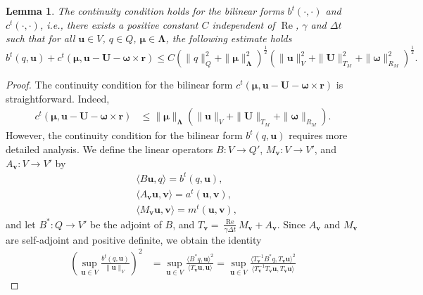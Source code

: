 \documentclass[10pt,a4paper]{amsart}
\newtheorem{lemma}{Lemma}
\newcommand{\Reynolds}{{\operatorname{Re}}}
\newcommand{\bU}{{\mathbf{U}}}
\newcommand{\bomega}{{\boldsymbol{\omega}}}
\newcommand{\bu}{{\mathbf{u}}}
\newcommand{\bv}{{\mathbf{v}}}
\begin{document}
\begin{lemma}
    The continuity condition holds for the bilinear forms $b^t(\cdot,\cdot)$ and $c^t(\cdot,\cdot)$, i.e., there exists a positive constant $C$ independent of $\Reynolds$, $\gamma$ and $\Delta t$ such that for all $\bu\in V$, ${q}\in Q$, ${\boldsymbol{\mu}}\in\boldsymbol{\Lambda}$, the following estimate holds
    \begin{equation}
        {b}^t({q},\bu)+{c}^t({\boldsymbol{\mu}},\bu - {\bU} - {\bomega}\times\mathbf{r})\leq C(\|{q}\|_Q^2+\|{\boldsymbol{\mu}}\|_{\boldsymbol{\Lambda}}^2)^\frac12 (\|\bu\|_V^2 + \|{\bU}\|_{T_M}^2 + \|{\bomega}\|_{R_M}^2)^\frac12.
    \end{equation}
\end{lemma}

\begin{proof}
    The continuity condition for the bilinear form $c^t(\boldsymbol{\mu},\bu - \bU - \bomega\times\mathbf{r})$ is  straightforward. Indeed,
\begin{equation}
    \begin{aligned}
        {c}^t({\boldsymbol{\mu}},\bu - {\bU} - {\bomega}\times\mathbf{r})
        &\leq \|{\boldsymbol{\mu}}\|_{\boldsymbol{\Lambda}} \left( \|\bu\|_V + \|\bU\|_{T_M} + \|\bomega\|_{R_M} \right).
    \end{aligned}
\end{equation}
However, the continuity condition for the bilinear form $b^t(q,\bu)$ requires more detailed analysis. 
We define the linear operators $B: V \to Q'$, $M_\bv: V \to V'$, and $A_\bv: V \to V'$ by
\begin{equation}
    \begin{aligned}
        &\langle B\bu, q \rangle = b^t(q, \bu), \\
        &\langle A_\bv\bu, \bv \rangle = a^t(\bu, \bv), \\
        &\langle M_\bv\bu, \bv \rangle = m^t(\bu, \bv),
    \end{aligned}
\end{equation}
and let $B^*: Q \to V'$ be the adjoint of $B$, and $T_\bv = \frac{\Reynolds}{\gamma\Delta t} M_\bv + A_\bv$. Since $A_\bv$ and $M_\bv$ are self-adjoint and positive definite, we obtain the identity
\begin{equation}
    \begin{aligned}
    \left( \sup_{\bu \in V} \frac{b^t(q, \bu)}{\|\bu\|_V} \right)^2 
    &= \sup_{\bu \in V} \frac{\langle B^* q, \bu \rangle^2}{\langle T_\bv \bu, \bu \rangle} 
     = \sup_{\bu \in V} \frac{\langle T_\bv^{-1} B^* q, T_\bv \bu \rangle^2}{\langle T_\bv^{-1} T_\bv \bu, T_\bv \bu \rangle} 

\end{aligned}
\end{equation}
\end{proof}
\end{document}
